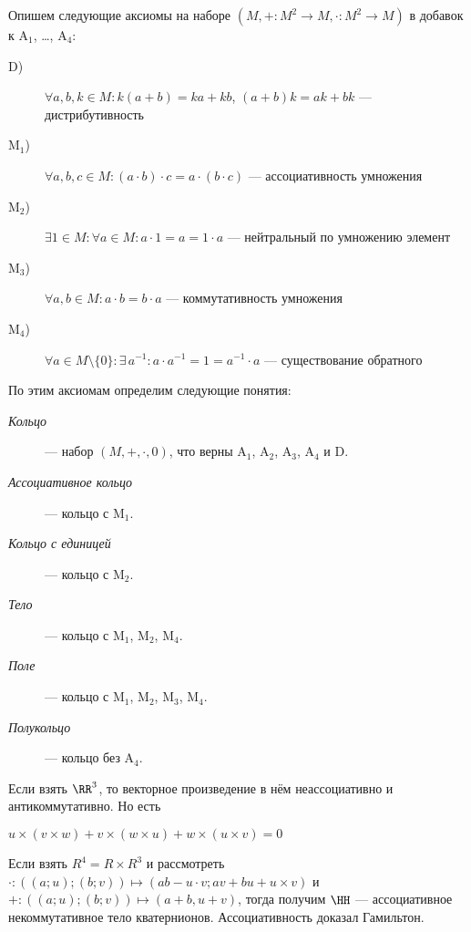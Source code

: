 \documentclass[12pt,a4paper]{article}
\newcommand{\A}{\ensuremath{\mathrm{A}}\xspace}
\newcommand{\D}{\ensuremath{\mathrm{D}}\xspace}
\newcommand{\M}{\ensuremath{\mathrm{M}}\xspace}
\begin{document}
    \begin{definition} Опишем следующие аксиомы на наборе $(M, +: M^2 \to M, \cdot: M^2 \to M)$ в добавок к $\A_1$, \dots, $\A_4$:
        \begin{description}
            \item[$\D$)] $\forall a, b, k \in M: k(a + b) = ka + kb$, $(a + b)k = ak + bk$ --- дистрибутивность
            \item[$\M_1$)] $\forall a, b, c \in M: (a \cdot b) \cdot c = a \cdot (b \cdot c)$ --- ассоциативность умножения
            \item[$\M_2$)] $\exists 1 \in M: \forall a \in M: a \cdot 1 = a = 1 \cdot a$ --- нейтральный по умножению элемент
            \item[$\M_3$)] $\forall a, b \in M: a \cdot b = b \cdot a$ --- коммутативность умножения
            \item[$\M_4$)] $\forall a \in M \setminus \{0\}: \exists\, a^{-1}: a \cdot a^{-1} = 1 = a^{-1} \cdot a$ --- существование обратного
        \end{description}
        По этим аксиомам определим следующие понятия:
        \begin{description}
            \item[\emph{Кольцо}] --- набор $(M, +, \cdot, 0)$, что верны $\A_1$, $\A_2$, $\A_3$, $\A_4$ и $\D$.
            \item[\emph{Ассоциативное кольцо}] --- кольцо с $\M_1$.
            \item[\emph{Кольцо с единицей}] --- кольцо с $\M_2$.
            \item[\emph{Тело}] --- кольцо с $\M_1$, $\M_2$, $\M_4$.
            \item[\emph{Поле}] --- кольцо с $\M_1$, $\M_2$, $\M_3$, $\M_4$.
            \item[\emph{Полукольцо}] --- кольцо без $\A_4$.
        \end{description}
    \end{definition}

    \begin{example}
        Если взять $\RR^3$, то векторное произведение в нём неассоциативно и антикоммутативно. Но есть
        \begin{lemma*}
            $u\times (v\times w) + v\times (w\times u) + w\times (u\times v) = 0$
        \end{lemma*}
    \end{example}

    \begin{example}
        Если взять $R^4 = R \times R^3$ и рассмотреть $\cdot: ((a; u); (b; v)) \mapsto (ab-u\cdot v; av + bu + u\times v)$ и $+: ((a; u); (b; v)) \mapsto (a + b, u + v)$, тогда получим $\HH$ --- ассоциативное некоммутативное тело кватернионов. Ассоциативность доказал Гамильтон.
    \end{example}
\end{document}
